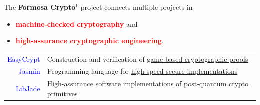 The \textbf{Formosa Crypto}$^1$ project connects multiple projects in \begin{itemize}
	\item[(1)] \textcolor{red}{\bf machine-checked cryptography} and
	\item[(2)] \textcolor{red}{\bf high-assurance cryptographic engineering}.
\end{itemize}
\begin{table}[h!]
\renewcommand{\arraystretch}{1.5} %
\begin{tabular}{rl}
	\textcolor{blue}{EasyCrypt} & Construction and verification of \underline{game-based cryptographic proofs} \\
	\textcolor{blue}{Jasmin} & Programming language for \underline{high-speed secure implementations} \\
	\textcolor{blue}{LibJade} & High-assurance software implementations of \underline{post-quantum crypto primitives}
\end{tabular}
\end{table}

